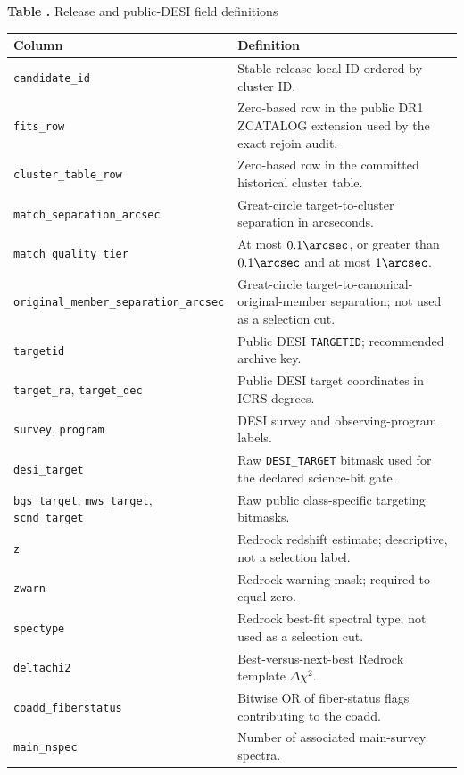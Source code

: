 \documentclass[twocolumn]{aastex701}
\begin{document}
\clearpage
{}\label{tab:public-fields}
\begin{center}
\textbf{Table \thetable.} Release and public-DESI field definitions

\smallskip
\scriptsize
\begin{tabular}{p{}p{}}
\toprule
Column & Definition \\
\midrule
\texttt{candidate\_id} & Stable release-local ID ordered by cluster ID. \\
\texttt{fits\_row} & Zero-based row in the public DR1 ZCATALOG extension used by the exact rejoin audit. \\
\texttt{cluster\_table\_row} & Zero-based row in the committed historical cluster table. \\
\texttt{match\_separation\_arcsec} & Great-circle target-to-cluster separation in arcseconds. \\
\texttt{match\_quality\_tier} & At most $0.1\arcsec$, or greater than $0.1\arcsec$ and at most $1\arcsec$. \\
\texttt{original\_member\_separation\_arcsec} & Great-circle target-to-canonical-original-member separation; not used as a selection cut. \\
\texttt{targetid} & Public DESI \texttt{TARGETID}; recommended archive key. \\
\texttt{target\_ra}, \texttt{target\_dec} & Public DESI target coordinates in ICRS degrees. \\
\texttt{survey}, \texttt{program} & DESI survey and observing-program labels. \\
\texttt{desi\_target} & Raw \texttt{DESI\_TARGET} bitmask used for the declared science-bit gate. \\
\texttt{bgs\_target}, \texttt{mws\_target}, \texttt{scnd\_target} & Raw public class-specific targeting bitmasks. \\
\texttt{z} & Redrock redshift estimate; descriptive, not a selection label. \\
\texttt{zwarn} & Redrock warning mask; required to equal zero. \\
\texttt{spectype} & Redrock best-fit spectral type; not used as a selection cut. \\
\texttt{deltachi2} & Best-versus-next-best Redrock template $\Delta\chi^2$. \\
\texttt{coadd\_fiberstatus} & Bitwise OR of fiber-status flags contributing to the coadd. \\
\texttt{main\_nspec} & Number of associated main-survey spectra. \\

\end{tabular}
\end{center}
\end{document}
